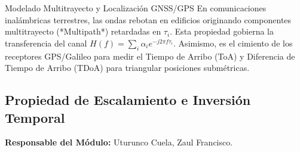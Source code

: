 \documentclass[11pt,a4paper]{article}
\begin{document}
\begin{telecomAppBox}{Modelado Multitrayecto y Localizaci\'on GNSS/GPS}
En comunicaciones inal\'ambricas terrestres, las ondas rebotan en edificios originando componentes multitrayecto (*Multipath*) retardadas en $\tau_i$. Esta propiedad gobierna la transferencia del canal $H(f) = \sum_i \alpha_i e^{-j2\pi f \tau_i}$. Asimismo, es el cimiento de los receptores GPS/Galileo para medir el Tiempo de Arribo (ToA) y Diferencia de Tiempo de Arribo (TDoA) para triangular posiciones subm\'etricas.
\end{telecomAppBox}

\subsection{Propiedad de Escalamiento e Inversi\'on Temporal}
\textbf{Responsable del M\'odulo:} Uturunco Cuela, Zaul Francisco.
\end{document}
